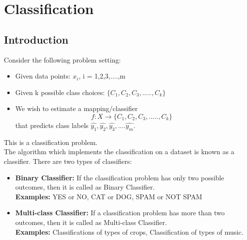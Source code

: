 \documentclass[10pt]{article}
\begin{document}
\newpage
\section{Classification}
\subsection{Introduction}
Consider the following problem setting:
\begin{itemize}
\item Given data points: \textbf{$x_i$}, i = 1,2,3,....,m
\item Given k possible class choices: $\{C_1, C_2, C_3,....., C_k\}$
\item We wish to estimate a mapping/classifier
\begin{equation*}
f: X \rightarrow \{C_1, C_2, C_3,....., C_k\}
\end{equation*}
that predicts class labels $\hat{y_1}, \hat{y_2}, \hat{y_3}, .... \hat{y_m}$.
\end{itemize}
This is a classification problem.\\
The algorithm which implements the classification on a dataset is known as a classifier. There are two types of classifiers:
\begin{itemize}
\item \textbf{Binary Classifier:} If the classification problem has only two possible outcomes, then it is called as Binary Classifier.\\
\textbf{Examples:} YES or NO, CAT or DOG, SPAM or NOT SPAM
\item \textbf{Multi-class Classifier:} If a classification problem has more than two outcomes, then it is called as Multi-class Classifier.\\
\textbf{Examples:} Classifications of types of crops, Classification of types of music.
\end{itemize}
\end{document}
